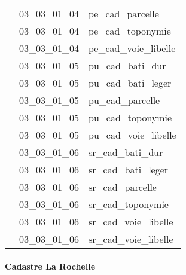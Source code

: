 \documentclass[12pt,titlepage]{book}
\begin{document}
\begin{supertabular}{|p{10cm}|c|p{15cm}|}
                    & 03\_03\_01\_04 & pe\_cad\_parcelle\\


                    & 03\_03\_01\_04 & pe\_cad\_toponymie\\


                    & 03\_03\_01\_04 & pe\_cad\_voie\_libelle\\


                    & 03\_03\_01\_05 & pu\_cad\_bati\_dur\\


                    & 03\_03\_01\_05 & pu\_cad\_bati\_leger\\


                    & 03\_03\_01\_05 & pu\_cad\_parcelle\\


                    & 03\_03\_01\_05 & pu\_cad\_toponymie\\


                    & 03\_03\_01\_05 & pu\_cad\_voie\_libelle\\


                    & 03\_03\_01\_06 & sr\_cad\_bati\_dur\\


                    & 03\_03\_01\_06 & sr\_cad\_bati\_leger\\


                    & 03\_03\_01\_06 & sr\_cad\_parcelle\\


                    & 03\_03\_01\_06 & sr\_cad\_toponymie\\


                    & 03\_03\_01\_06 & sr\_cad\_voie\_libelle\\


                    & 03\_03\_01\_06 & sr\_cad\_voie\_libelle\\
\hline
\end{supertabular}


\paragraph{Cadastre La Rochelle}
\noindent
\vspace{\baselineskip}
\end{document}
